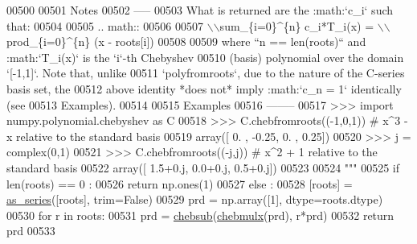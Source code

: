 \begin{DoxyCode}
00500 \textcolor{stringliteral}{}
00501 \textcolor{stringliteral}{    Notes}
00502 \textcolor{stringliteral}{    -----}
00503 \textcolor{stringliteral}{    What is returned are the :math:`c\_i` such that:}
00504 \textcolor{stringliteral}{}
00505 \textcolor{stringliteral}{    .. math::}
00506 \textcolor{stringliteral}{}
00507 \textcolor{stringliteral}{        \(\backslash\)\(\backslash\)sum\_\{i=0\}^\{n\} c\_i*T\_i(x) = \(\backslash\)\(\backslash\)prod\_\{i=0\}^\{n\} (x - roots[i])}
00508 \textcolor{stringliteral}{}
00509 \textcolor{stringliteral}{    where ``n == len(roots)`` and :math:`T\_i(x)` is the `i`-th Chebyshev}
00510 \textcolor{stringliteral}{    (basis) polynomial over the domain `[-1,1]`.  Note that, unlike}
00511 \textcolor{stringliteral}{    `polyfromroots`, due to the nature of the C-series basis set, the}
00512 \textcolor{stringliteral}{    above identity *does not* imply :math:`c\_n = 1` identically (see}
00513 \textcolor{stringliteral}{    Examples).}
00514 \textcolor{stringliteral}{}
00515 \textcolor{stringliteral}{    Examples}
00516 \textcolor{stringliteral}{    --------}
00517 \textcolor{stringliteral}{    >>> import numpy.polynomial.chebyshev as C}
00518 \textcolor{stringliteral}{    >>> C.chebfromroots((-1,0,1)) # x^3 - x relative to the standard basis}
00519 \textcolor{stringliteral}{    array([ 0.  , -0.25,  0.  ,  0.25])}
00520 \textcolor{stringliteral}{    >>> j = complex(0,1)}
00521 \textcolor{stringliteral}{    >>> C.chebfromroots((-j,j)) # x^2 + 1 relative to the standard basis}
00522 \textcolor{stringliteral}{    array([ 1.5+0.j,  0.0+0.j,  0.5+0.j])}
00523 \textcolor{stringliteral}{}
00524 \textcolor{stringliteral}{    """}
00525     \textcolor{keywordflow}{if} len(roots) == 0 :
00526         \textcolor{keywordflow}{return} np.ones(1)
00527     \textcolor{keywordflow}{else} :
00528         [roots] = \hyperlink{namespacepyneb_1_1utils_1_1polyutils_a9c3751d438f0f75922155c7823fe2699}{as\_series}([roots], trim=\textcolor{keyword}{False})
00529         prd = np.array([1], dtype=roots.dtype)
00530         \textcolor{keywordflow}{for} r \textcolor{keywordflow}{in} roots:
00531             prd = \hyperlink{namespacepyneb_1_1utils_1_1chebyshev_a2ca3ca3bac02e30625edb4c48ada7ddf}{chebsub}(\hyperlink{namespacepyneb_1_1utils_1_1chebyshev_a91d78fa31041dfe9ccf7bbc0891809b3}{chebmulx}(prd), r*prd)
00532         \textcolor{keywordflow}{return} prd
00533 

\end{DoxyCode}
